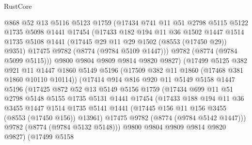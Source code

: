 \begin{lexlean}{RustCore}
\begin{coremodule}
              @868
              @52
              @13
              @5116
              @5123
              @1759
              (@17434
                @741
                @11
                @51
                @2798
                @5115
                @5122
                @1735
                @5098
                @1441
                @17454
                (@17433
                  @182
                  @194
                  @11
                  @36
                  @1502
                  @1447
                  @1514
                  @1735
                  @5108
                  @1441
                  (@17445 @29 @11 @29 @1502 (@8553 (@17450 @29)) @9351)
                  @17475
                  @9782
                  (@8774 (@9784 @5109 @1447)))
                @9782
                (@8774 (@9784 @5099 @5115)))
              @9800
              @9804
              @9809
              @9814
              @9820
              @9827)
            (@17499
              @5125
              @382
              @921
              @11
              @1447
              @1860
              @5149
              @5196
              (@17509 @382 @11 @1860 (@17468 @381 @1860 @10110 @10114))
              (@17414
                @914
                @816
                @920
                @11
                @5149
                @5158
                @1447
                @5196
                (@17425
                  @872
                  @52
                  @13
                  @5149
                  @5156
                  @1759
                  (@17434
                    @699
                    @11
                    @51
                    @2798
                    @5148
                    @5155
                    @1735
                    @5131
                    @1441
                    @17454
                    (@17433
                      @188
                      @194
                      @11
                      @36
                      @3455
                      @1447
                      @1514
                      @1735
                      @5141
                      @1441
                      (@17445 @156 @11 @156 @3455 (@8553 (@17450 @156)) @13961)
                      @17475
                      @9782
                      (@8774 (@9784 @5142 @1447)))
                    @9782
                    (@8774 (@9784 @5132 @5148)))
                  @9800
                  @9804
                  @9809
                  @9814
                  @9820
                  @9827)
                (@17499
                  @5158

\end{coremodule}
\end{lexlean}
